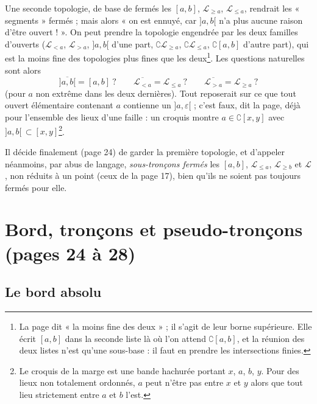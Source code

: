 \documentclass[11pt,a4paper]{article}
\begin{document}
Une seconde topologie, de base de fermés les $[a,b]$, $\mathcal{L}_{\geq a}$,
$\mathcal{L}_{\leq a}$, rendrait les « segments » fermés ; mais alors « on est
ennuyé, car $]a,b[$ n'a plus aucune raison d'être ouvert ! ». On peut prendre la
topologie engendrée par les deux familles d'ouverts ($\mathcal{L}_{<a}$,
$\mathcal{L}_{>a}$, $]a,b[$ d'une part, $\complement \mathcal{L}_{\geq a}$,
$\complement \mathcal{L}_{\leq a}$, $\complement [a,b]$ d'autre part), qui est
la moins fine des topologies plus fines que les deux\footnote{La page dit « la
moins fine des deux » ; il s'agit de leur borne supérieure. Elle écrit $[a,b]$
dans la seconde liste là où l'on attend $\complement [a,b]$, et la réunion des
deux listes n'est qu'une sous-base : il faut en prendre les intersections
finies.}. Les questions naturelles sont alors
\[
\overline{]a,b[} = [a,b] \ ? \qquad \overline{\mathcal{L}_{<a}} =
\mathcal{L}_{\leq a} \ ? \qquad \overline{\mathcal{L}_{>a}} = \mathcal{L}_{\geq a}
\ ?
\]
(pour $a$ non extrême dans les deux dernières). Tout reposerait sur ce que tout
ouvert élémentaire contenant $a$ contienne un $]a, \varepsilon[$ ; c'est faux,
dit la page, déjà pour l'ensemble des lieux d'une faille : un croquis montre
$a \in \complement [x,y]$ avec $]a,b[ \,\subset [x,y]$\footnote{Le croquis de la
marge est une bande hachurée portant $x$, $a$, $b$, $y$. Pour des lieux non
totalement ordonnés, $a$ peut n'être pas entre $x$ et $y$ alors que tout lieu
strictement entre $a$ et $b$ l'est.}.

Il décide finalement (page 24) de garder la première topologie, et d'appeler
néanmoins, par abus de langage, \emph{sous-tronçons fermés} les $[a,b]$,
$\mathcal{L}_{\leq a}$, $\mathcal{L}_{\geq b}$ et $\mathcal{L}$, non réduits à un
point (ceux de la page 17), bien qu'ils ne soient pas toujours fermés pour
elle.

\section*{Bord, tronçons et pseudo-tronçons (pages 24 à 28)}

\subsection*{Le bord absolu}
\end{document}
